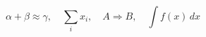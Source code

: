 \documentclass{article}
\begin{document}
\[
  \alpha+\beta\approx\gamma,\quad
  \sum_i x_i,\quad
  A \Rightarrow B,\quad
  \int f(x)\,dx
\]
\end{document}
